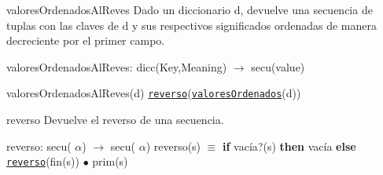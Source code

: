 \begin{DoxyParagraph}{valores\-Ordenados\-Al\-Reves}
Dado un diccionario d, devuelve una secuencia de tuplas con las claves de d y sus respectivos significados ordenadas de manera decreciente por el primer campo.

valores\-Ordenados\-Al\-Reves\-: dicc(\-Key,\-Meaning) $\to$ secu(value) \par
valores\-Ordenados\-Al\-Reves(d) \href{axiomas.html#reverso}{\tt reverso}(\href{axiomas.html#valoresOrdenados}{\tt valores\-Ordenados}(d))


\end{DoxyParagraph}
\begin{DoxyParagraph}{reverso}
Devuelve el reverso de una secuencia.

reverso\-: secu( $\alpha$) $\to$ secu( $\alpha$) reverso(s) $\equiv$ {\bfseries if} vacía?(s) {\bfseries then} vacía {\bfseries else} \href{axiomas.html#reverso}{\tt reverso}(fin(s)) $\bullet$ prim(s) 
\end{DoxyParagraph}
